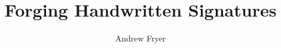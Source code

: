 

\title{Forging Handwritten Signatures}
\author{Andrew Fryer}


\maketitle

\begin{abstract}
\end{abstract}  













\clearpage

\appendix


% 



